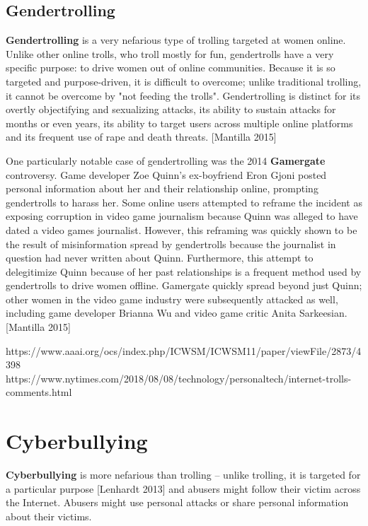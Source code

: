 \documentclass[class=book, crop=false]{standalone}
\providecommand{\keyterm}[1]{\textbf{#1}\marginnote{\scriptsize \textbf{#1}}}
\begin{document}
\subsection{Gendertrolling}

\keyterm{Gendertrolling} is a very nefarious type of trolling targeted at women online. Unlike other online trolls, who troll mostly for fun, gendertrolls have a very specific purpose: to drive women out of online communities. Because it is so targeted and purpose-driven, it is difficult to overcome; unlike traditional trolling, it cannot be overcome by "not feeding the trolls". Gendertrolling is distinct for its overtly objectifying and sexualizing attacks, its ability to sustain attacks for months or even years, its ability to target users across multiple online platforms and its frequent use of rape and death threats. [Mantilla 2015]

One particularly notable case of gendertrolling was the 2014 \keyterm{Gamergate} controversy. Game developer Zoe Quinn's ex-boyfriend Eron Gjoni posted personal information about her and their relationship online, prompting gendertrolls to harass her. Some online users attempted to reframe the incident as exposing corruption in video game journalism because Quinn was alleged to have dated a video games journalist. However, this reframing was quickly shown to be the result of misinformation spread by gendertrolls because the journalist in question had never written about Quinn. Furthermore, this attempt to delegitimize Quinn because of her past relationships is a frequent method used by gendertrolls to drive women offline. Gamergate quickly spread beyond just Quinn; other women in the video game industry were subsequently attacked as well, including game developer Brianna Wu and video game critic Anita Sarkeesian. [Mantilla 2015]

https://www.aaai.org/ocs/index.php/ICWSM/ICWSM11/paper/viewFile/2873/4398\\

https://www.nytimes.com/2018/08/08/technology/personaltech/internet-trolls-comments.html


\section{Cyberbullying}

\keyterm{Cyberbullying} is more nefarious than trolling -- unlike trolling, it is targeted for a particular purpose [Lenhardt 2013] and abusers might follow their victim across the Internet. Abusers might use personal attacks or share personal information about their victims.
\end{document}
